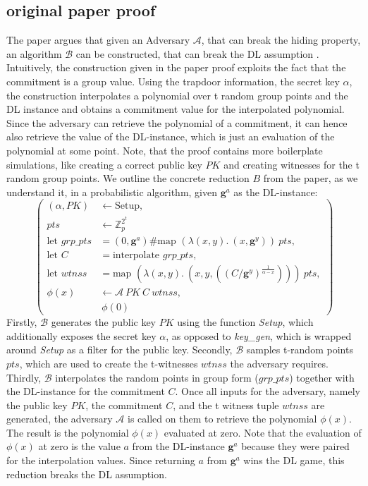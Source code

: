 \subsection{original paper proof}
The paper argues that given an Adversary $\mathcal{A}$, that can break the hiding property, an algorithm $\mathcal{B}$ can be constructed, that can break the DL assumption \parencite{KZG}. Intuitively, the construction given in the paper proof exploits the fact that the commitment is a group value. Using the trapdoor information, the secret key $\alpha$, the construction interpolates a polynomial over t random group points and the DL instance and obtains a commitment value for the interpolated polynomial. Since the adversary can retrieve the polynomial of a commitment, it can hence also retrieve the value of the DL-instance, which is just an evaluation of the polynomial at some point. Note, that the proof contains more boilerplate simulations, like creating a correct public key $PK$ and creating witnesses for the t random group points. We outline the concrete reduction $B$ from the paper, as we understand it, in a probabilistic algorithm, given $\mathbf{g}^a$ as the DL-instance:
\begin{equation*}
    \left(
        \begin{aligned}
            (\alpha,PK) & \leftarrow \text{Setup}, \\
            pts & \leftarrow \mathbb{Z}_p^{2^t}\\
            \text{let } grp\_pts &= (0,\mathbf{g}^a)\#\text{map } (\lambda (x,y).\ (x,\mathbf{g}^y))\ pts,\\
            \text{let } C &= \text{interpolate } grp\_pts,\\ 
            \text{let } wtnss &= \text{map } (\lambda (x,y).\ (x,y, ((C/\mathbf{g}^y)^{\frac{1}{\alpha-x}})))\ pts,\\
            \phi(x) & \leftarrow \mathcal{A}\ PK \ C\ wtnss, \\
            & \ \phi(0)
        \end{aligned}
    \right)
\end{equation*}
Firstly, $\mathcal{B}$ generates the public key $PK$ using the function \textit{Setup}, which additionally exposes the secret key $\alpha$, as opposed to \textit{key\_gen}, which is wrapped around \textit{Setup} as a filter for the public key. Secondly, $\mathcal{B}$ samples t-random points $pts$, which are used to create the t-witnesses $wtnss$ the adversary requires. Thirdly, $\mathcal{B}$ interpolates the random points in group form ($grp\_pts$) together with the DL-instance for the commitment $C$. Once all inputs for the adversary, namely the public key $PK$, the commitment $C$, and the t witness tuple $wtnss$ are generated, the adversary $\mathcal{A}$ is called on them to retrieve the polynomial $\phi(x)$. The result is the polynomial $\phi(x)$ evaluated at zero. Note that the evaluation of $\phi(x)$ at zero is the value $a$ from the DL-instance $\mathbf{g}^a$ because they were paired for the interpolation values. Since returning $a$ from $\mathbf{g}^a$ wins the DL game, this reduction breaks the DL assumption.

